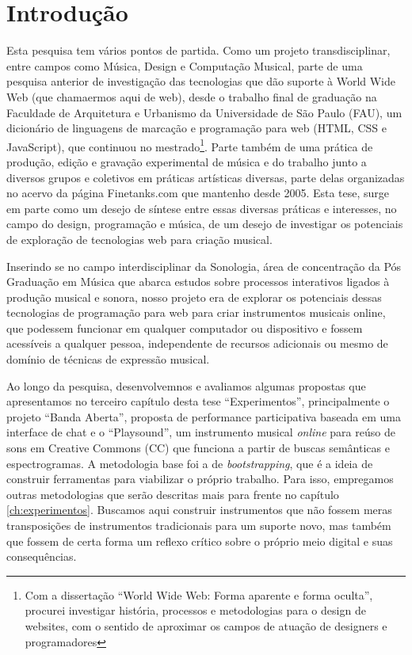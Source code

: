 

\chapter*{Introdução}
\label{ch:intro}

Esta pesquisa tem vários pontos de partida. Como um projeto transdisciplinar, entre campos como Música, Design e Computação Musical, parte de uma pesquisa anterior de investigação das tecnologias que dão suporte à World Wide Web (que chamaermos aqui de web), desde o trabalho final de graduação na Faculdade de Arquitetura e Urbanismo da Universidade de São Paulo (FAU), um dicionário de linguagens de marcação e programação para web (HTML, CSS e JavaScript), que continuou no mestrado\footnote{Com a dissertação ``World Wide Web: Forma aparente e forma oculta'', procurei investigar história, processos e metodologias para o design de websites, com o sentido de aproximar os campos de atuação de designers e programadores}. Parte também de uma prática de produção, edição e gravação experimental de música e do trabalho junto a diversos grupos e coletivos em  práticas artísticas diversas, parte delas organizadas no acervo da página Finetanks.com que mantenho desde 2005. Esta tese, surge em parte como um desejo de síntese entre essas diversas práticas e interesses, no campo do design, programação e música, de um desejo de investigar os potenciais de exploração de tecnologias web para criação musical. 

Inserindo se no campo interdisciplinar da Sonologia, área de concentração da Pós Graduação em Música que abarca estudos sobre processos interativos ligados à produção musical e sonora, nosso projeto era de explorar os potenciais dessas tecnologias de programação para web para criar instrumentos musicais online, que podessem funcionar em qualquer computador ou dispositivo e fossem acessíveis a qualquer pessoa, independente de recursos adicionais ou mesmo de domínio de técnicas de expressão musical.

 Ao longo da pesquisa, desenvolvemnos e avaliamos algumas propostas que apresentamos no terceiro capítulo desta tese ``Experimentos'', principalmente o projeto ``Banda Aberta'', proposta de performance participativa baseada em uma interface de chat e o ``Playsound'', um instrumento musical \emph{online} para reúso de sons em Creative Commons (CC) que funciona a partir de buscas semânticas e espectrogramas. A metodologia base foi a de \emph{bootstrapping}, que é a ideia de construir ferramentas para viabilizar o próprio trabalho. Para isso, empregamos outras metodologias que serão descritas mais para frente no capítulo \ref{ch:experimentos}. Buscamos aqui construir instrumentos que não fossem meras transposições de instrumentos tradicionais para um suporte novo, mas também que fossem de certa forma um reflexo crítico sobre o próprio meio digital e suas consequências. 
    
